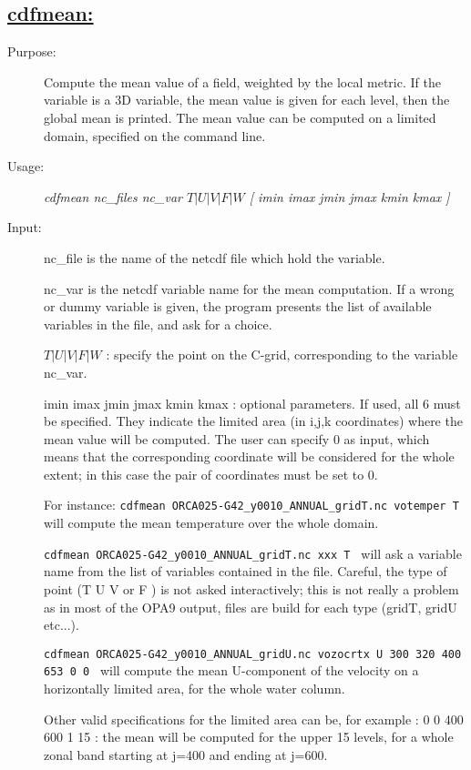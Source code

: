 \documentclass[a4paper,11pt]{article}
\begin{document}
\subsection*{\underline{cdfmean:}}
\begin{description}
\item[Purpose:] Compute the mean value of a field, weighted by the local metric. If the variable is a 3D variable,
the mean value is given for each level, then the global mean is printed. The mean value can be computed on a limited
domain, specified on the command line.
\item[Usage:] {\em cdfmean nc\_files nc\_var  $T | U | V | F | W$ [ imin imax jmin jmax kmin kmax ] }
\item[Input:] nc\_file is the name of the netcdf file which hold the variable. 

nc\_var is the netcdf variable name for the mean computation. If a wrong or dummy variable is given, the program
presents the list of available variables in the file, and ask for a choice.

$ T | U | V | F | W $ : specify the point on the C-grid, corresponding to the variable nc\_var.

imin imax jmin jmax  kmin kmax : optional parameters. If used, all 6 must be specified. They indicate the limited
area (in i,j,k coordinates) where the mean value will be computed. The user can specify 0 as input, which means that
the corresponding coordinate will be considered for the whole extent; in this case the pair of coordinates must be set 
to 0. 

For instance: {\tt cdfmean  ORCA025-G42\_y0010\_ANNUAL\_gridT.nc votemper T } will compute the mean temperature over
the whole domain.

 {\tt cdfmean  ORCA025-G42\_y0010\_ANNUAL\_gridT.nc xxx T } will ask a variable name from the list of variables contained
in the file. Careful, the type of point (T U V or F ) is not asked interactively; this is not really a problem as in most
of the OPA9 output, files are build for each type (gridT, gridU etc...).

 {\tt cdfmean  ORCA025-G42\_y0010\_ANNUAL\_gridU.nc vozocrtx U  300 320 400 653 0 0 } will compute the mean U-component
of the velocity on a horizontally limited area, for the whole water column. 

 Other valid specifications for the limited area 
can be, for example : 0 0  400 600 1 15 : the mean will be computed for the upper 15 levels, for a whole zonal band starting
at j=400 and ending at j=600.


\end{description}
\end{document}
